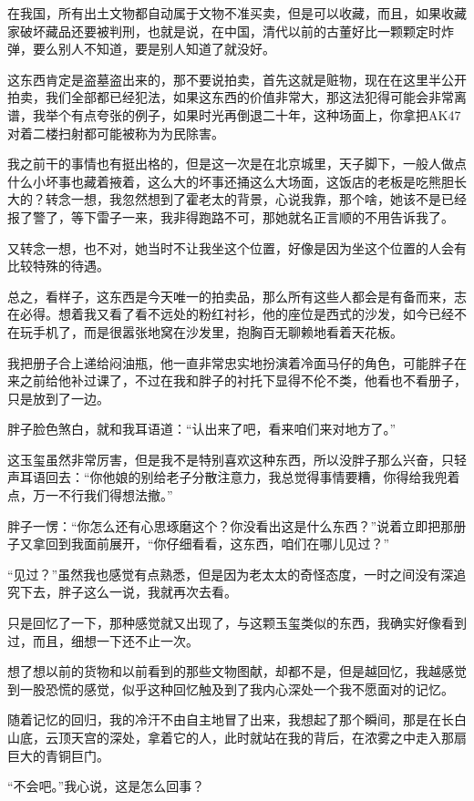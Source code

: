 在我国，所有出土文物都自动属于文物不准买卖，但是可以收藏，而且，如果收藏家破坏藏品还要被判刑，也就是说，在中国，清代以前的古董好比一颗颗定时炸弹，要么别人不知道，要是别人知道了就没好。

这东西肯定是盗墓盗出来的，那不要说拍卖，首先这就是赃物，现在在这里半公开拍卖，我们全部都已经犯法，如果这东西的价值非常大，那这法犯得可能会非常离谱，我举个有点夸张的例子，如果时光再倒退二十年，这种场面上，你拿把AK47对着二楼扫射都可能被称为为民除害。

我之前干的事情也有挺出格的，但是这一次是在北京城里，天子脚下，一般人做点什么小坏事也藏着掖着，这么大的坏事还捅这么大场面，这饭店的老板是吃熊胆长大的？转念一想，我忽然想到了霍老太的背景，心说我靠，那个啥，她该不是已经报了警了，等下雷子一来，我非得跑路不可，那她就名正言顺的不用告诉我了。

又转念一想，也不对，她当时不让我坐这个位置，好像是因为坐这个位置的人会有比较特殊的待遇。

总之，看样子，这东西是今天唯一的拍卖品，那么所有这些人都会是有备而来，志在必得。想着我又看了看不远处的粉红衬衫，他的座位是西式的沙发，如今已经不在玩手机了，而是很嚣张地窝在沙发里，抱胸百无聊赖地看着天花板。

我把册子合上递给闷油瓶，他一直非常忠实地扮演着冷面马仔的角色，可能胖子在来之前给他补过课了，不过在我和胖子的衬托下显得不伦不类，他看也不看册子，只是放到了一边。

胖子脸色煞白，就和我耳语道：“认出来了吧，看来咱们来对地方了。”

这玉玺虽然非常厉害，但是我不是特别喜欢这种东西，所以没胖子那么兴奋，只轻声耳语回去：“你他娘的别给老子分散注意力，我总觉得事情要糟，你得给我兜着点，万一不行我们得想法撤。”

胖子一愣：“你怎么还有心思琢磨这个？你没看出这是什么东西？”说着立即把那册子又拿回到我面前展开，“你仔细看看，这东西，咱们在哪儿见过？”

“见过？”虽然我也感觉有点熟悉，但是因为老太太的奇怪态度，一时之间没有深追究下去，胖子这么一说，我就再次去看。

只是回忆了一下，那种感觉就又出现了，与这颗玉玺类似的东西，我确实好像看到过，而且，细想一下还不止一次。

想了想以前的货物和以前看到的那些文物图献，却都不是，但是越回忆，我越感觉到一股恐慌的感觉，似乎这种回忆触及到了我内心深处一个我不愿面对的记忆。

随着记忆的回归，我的冷汗不由自主地冒了出来，我想起了那个瞬间，那是在长白山底，云顶天宫的深处，拿着它的人，此时就站在我的背后，在浓雾之中走入那扇巨大的青铜巨门。

“不会吧。”我心说，这是怎么回事？

